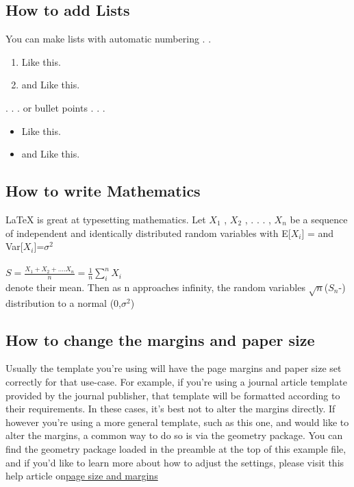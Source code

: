 \documentclass{article}
\begin{document}
    \subsection{How to add Lists}
    You can make lists with automatic numbering . .
    \begin{enumerate}
        \item Like this.
        \item and Like this.
    \end{enumerate}
    . . . or bullet points . . .	
    \begin{itemize}
    	\item Like this.
    	\item and Like this.
    \end{itemize}
   \subsection{How to write Mathematics}
   \LaTeX{} is great at typesetting mathematics. Let $X_1$ , $X_2$ , . . . , $X_n$ be a sequence of independent and
   identically distributed random variables with E[$X_i$] = \textmu  and Var[$X_i$]=$\sigma^2$
   \\
   \\
   \begin{math}
   	S=\frac{X_1+X_2+....X_n}{n} =\frac{1}{n}\sum^n_i X_i
   \end{math}
    \\
    denote their mean. Then as n approaches infinity, the random variables $\sqrt{n}$($S_n$-\textmu)
    distribution to a normal (0,$\sigma^2$)
   \subsection{How to change the margins and paper size}
   Usually the template you’re using will have the page margins and paper size set correctly for that
   use-case. For example, if you’re using a journal article template provided by the journal publisher,
   that template will be formatted according to their requirements. In these cases, it’s best not to alter
   the margins directly.
   If however you’re using a more general template, such as this one, and would like to alter the
   margins, a common way to do so is via the geometry package. You can find the geometry package
   loaded in the preamble at the top of this example file, and if you’d like to learn more about how to
   adjust the settings, please visit this help article on\href{https://www.overleaf.com/learn/latex/page_size_and_margins}{page size and margins}
\end{document}
